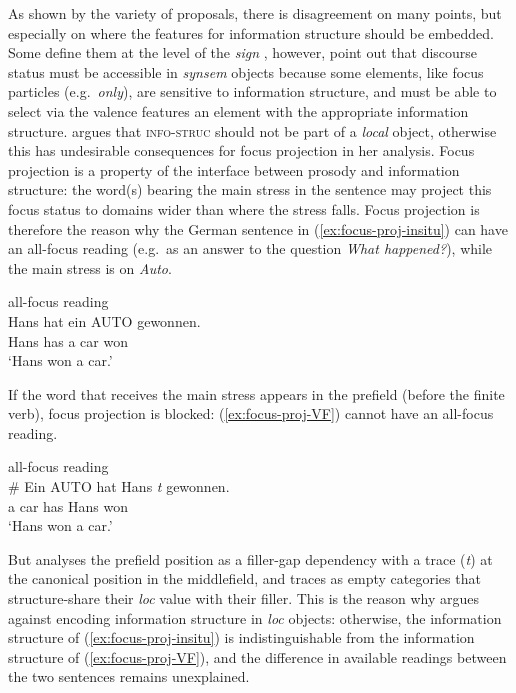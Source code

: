 As shown by the variety of proposals, there is disagreement on many points, but especially on where the features for information structure should be embedded. Some define them at the level of the \emph{sign} \citep{DeKuthy.2002,Bildhauer.2008}, however, \citet*[145]{Mueller.S.2020?.chapter5} point out that discourse status must be accessible in \emph{synsem} objects because some elements, like focus particles (e.g.\ \emph{only}),  are sensitive to information structure, and must be able to select via the valence features an element with the appropriate information structure. \citet[160--161]{DeKuthy.2002} argues that \textsc{info-struc} should not be part of a \emph{local} object, otherwise this has undesirable consequences for focus projection in her analysis. Focus projection is a property of the interface between prosody and information structure: the word(s) bearing the main stress in the sentence may project this focus status to domains wider than where the stress falls. Focus projection is therefore the reason why the German sentence in (\ref{ex:focus-proj-insitu}) can have an all-focus reading (e.g.\ as an answer to the question \emph{What happened?}), while the main stress is on \emph{Auto}.

\ea all-focus reading \citep[160]{DeKuthy.2002}\\
\gll Hans hat ein AUTO gewonnen.\\
Hans has a car won\\
\glt `Hans won a car.'
\label{ex:focus-proj-insitu}
\z 

If the word that receives the main stress appears in the prefield (before the finite verb), focus projection is blocked: (\ref{ex:focus-proj-VF}) cannot have an all-focus reading. 

\ea all-focus reading \citep[160]{DeKuthy.2002}\\
\# \gll Ein AUTO hat Hans \emph{t} gewonnen.\\
a car has Hans {} won\\
\glt `Hans won a car.'
\label{ex:focus-proj-VF}
\z 

But \citeauthor{DeKuthy.2002} analyses the prefield position as a filler-gap dependency with a trace (\emph{t}) at the canonical position in the middlefield, and traces as empty categories that structure-share their \emph{loc} value with their filler. This is the reason why \citeauthor{DeKuthy.2002} argues against encoding information structure in \emph{loc} objects: otherwise, the information structure of (\ref{ex:focus-proj-insitu}) is indistinguishable from  the information structure of (\ref{ex:focus-proj-VF}), and the difference in available readings between the two sentences remains unexplained.

